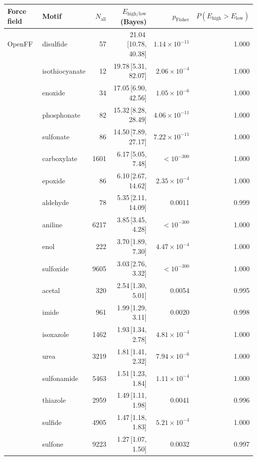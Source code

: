 \begin{table}[t]
  \centering
  \small
  \setlength{\tabcolsep}{6pt}
  \renewcommand{\arraystretch}{1.15}
  \begin{tabular}{llrrrr}
    \hline
    Force field & Motif & $N_\mathrm{all}$ & $E_{\mathrm{high/low}}$ (Bayes) & $p_\mathrm{Fisher}$ & $P(E_{\mathrm{high}}>E_{\mathrm{low}})$ \\
    \hline
    OpenFF & disulfide & 57 & 21.04\,[10.78, 40.38] & $1.14\times 10^{-11}$ & 1.000 \\
      & isothiocyanate & 12 & 19.78\,[5.31, 82.07] & $2.06\times 10^{-4}$ & 1.000 \\
      & enoxide & 34 & 17.05\,[6.90, 42.56] & $1.05\times 10^{-6}$ & 1.000 \\
      & phosphonate & 82 & 15.32\,[8.28, 28.49] & $4.06\times 10^{-11}$ & 1.000 \\
      & sulfonate & 86 & 14.50\,[7.89, 27.17] & $7.22\times 10^{-11}$ & 1.000 \\
      & carboxylate & 1601 & 6.17\,[5.05, 7.48] & $< 10^{-300}$ & 1.000 \\
      & epoxide & 86 & 6.10\,[2.67, 14.62] & $2.35\times 10^{-4}$ & 1.000 \\
      & aldehyde & 78 & 5.35\,[2.11, 14.09] & 0.0011 & 0.999 \\
      & aniline & 6217 & 3.85\,[3.45, 4.28] & $< 10^{-300}$ & 1.000 \\
      & enol & 222 & 3.70\,[1.89, 7.30] & $4.47\times 10^{-4}$ & 1.000 \\
      & sulfoxide & 9605 & 3.03\,[2.76, 3.32] & $< 10^{-300}$ & 1.000 \\
      & acetal & 320 & 2.54\,[1.30, 5.01] & 0.0054 & 0.995 \\
      & imide & 961 & 1.99\,[1.29, 3.11] & 0.0020 & 0.998 \\
      & isoxazole & 1462 & 1.93\,[1.34, 2.78] & $4.81\times 10^{-4}$ & 1.000 \\
      & urea & 3219 & 1.81\,[1.41, 2.32] & $7.94\times 10^{-6}$ & 1.000 \\
      & sulfonamide & 5463 & 1.51\,[1.23, 1.84] & $1.11\times 10^{-4}$ & 1.000 \\
      & thiazole & 2959 & 1.49\,[1.11, 1.98] & 0.0041 & 0.996 \\
      & sulfide & 4905 & 1.47\,[1.18, 1.83] & $5.21\times 10^{-4}$ & 1.000 \\
      & sulfone & 9223 & 1.27\,[1.07, 1.50] & 0.0032 & 0.997 \\
    \hline

\end{tabular}
\end{table}
